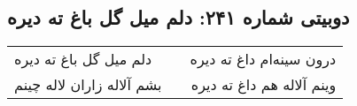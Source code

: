 \begin{center}
\section*{دوبیتی شماره ۲۴۱: دلم میل گل باغ ته دیره}
\label{sec:241}
\begin{longtable}{l p{0.5cm} r}
دلم میل گل باغ ته دیره
&&
درون سینه‌ام داغ ته دیره
\\
بشم آلاله زاران لاله چینم
&&
وینم آلاله هم داغ ته دیره
\\
\end{longtable}
\end{center}

